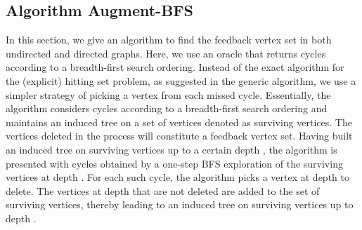 \documentclass[11pt]{article}
\begin{document}
\begin{center}
\end{center}


\subsection{Algorithm Augment-BFS}
In this section, we give an algorithm to find the feedback vertex set in both undirected and directed graphs. Here, we use an oracle that returns cycles according to a breadth-first search ordering. Instead of the exact algorithm for the (explicit) hitting set problem, as suggested in the generic algorithm, we use a simpler strategy of picking a vertex from each missed cycle. Essentially, the algorithm considers cycles according to a breadth-first search ordering and maintains an induced tree on a set of vertices denoted as surviving vertices. The vertices deleted in the process will constitute a feedback vertex set. Having built an induced tree on surviving vertices up to a certain depth , the algorithm is presented with cycles obtained by a one-step BFS exploration of the surviving vertices at depth . For each such cycle, the algorithm picks a vertex at depth  to delete. The vertices at depth  that are not deleted are added to the set of surviving vertices, thereby leading to an induced tree on surviving vertices up to depth .
\end{document}
